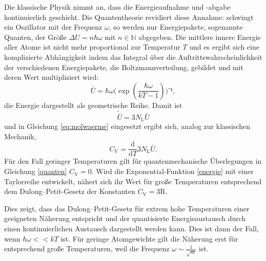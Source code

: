 Die klassische Physik nimmt an, dass die Energieaufnahme und -abgabe kontinuierlich geschieht.
Die Quantentheorie revidiert diese Annahme: 
schwingt ein Oszillator mit der Frequenz $\omega$, so werden nur Energiepakete, sogenannte Quanten, der Größe $\Delta{U}=n \hbar \omega$ mit $n\in\mathbb{N} $ abgegeben.
Die mittlere innere Energie aller Atome ist nicht mehr proportional zur Temperatur $T$ und es ergibt sich eine komplizierte Abhängigkeit indem das Integral über die Auftrittswahrscheinlichkeit der verschiedenen Energiepakete, die Boltzmannverteilung, gebildet und mit deren Wert multipliziert wird:
\begin{equation}
	{\bar{U}=\hbar\omega(\exp(\frac{\hbar\omega}{kT-1})})⁻¹,
	\label{energie}
\end{equation}
die Energie dargestellt als geometrische Reihe.
Damit ist
\begin{equation}
	\tilde{{\bar{U}}}=3N_\mathup{L}\bar{U}
\end{equation}
und in Gleichung \eqref{eq:molwaerme} eingesetzt ergibt sich, analog zur klassischen Mechanik,    
\begin{equation}
	C_\mathup{V}=\frac{\mathup{d}}{\mathup{d}T}3N_\mathup{L}\bar{U}.
	\label{quanten}
\end{equation}
Für den Fall geringer Temperaturen gilt für quantenmechanische Überlegungen in Gleichung \eqref{quanten} $C_\mathup{V}=0$. 
Wird die Exponential-Funktion \eqref{energie} mit einer Taylorreihe entwickelt, nähert sich ihr Wert für große Temperaturen entsprechend dem Dulong--Petit-Gesetz der Konstanten $C_\mathup{V}=3\text{R}$.

Dies zeigt, dass das Dulong--Petit-Gesetz für extrem hohe Temperaturen einer geeigneten Näherung entspricht und der quantisierte Energieaustausch durch einen kontinuierlichen Austausch dargestellt werden kann. 
Dies ist dann der Fall, wenn $\hbar\omega<<kT$ ist. 
Für geringe Atomgewichte gilt die Näherung erst für entsprechend große Temperaturen, weil die Frequenz $\omega\sim\frac{1}{\sqrt{m}}$ ist.
